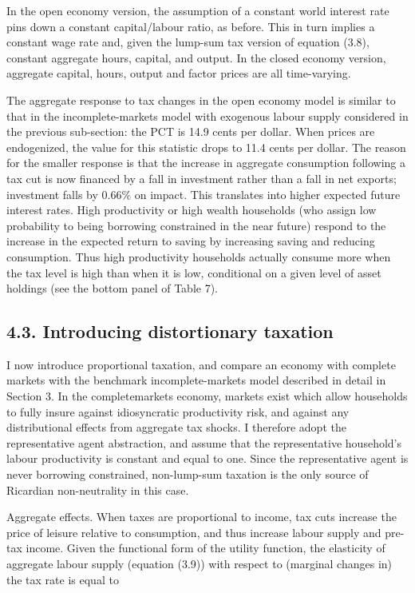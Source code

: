 \documentclass[11pt]{article}
\begin{document}
In the open economy version, the assumption of a constant world interest rate pins down a constant capital/labour ratio, as before. This in turn implies a constant wage rate and, given the lump-sum tax version of equation (3.8), constant aggregate hours, capital, and output. In the closed economy version, aggregate capital, hours, output and factor prices are all time-varying.

The aggregate response to tax changes in the open economy model is similar to that in the incomplete-markets model with exogenous labour supply considered in the previous sub-section: the PCT is 14.9 cents per dollar. When prices are endogenized, the value for this statistic drops to 11.4 cents per dollar. The reason for the smaller response is that the increase in aggregate consumption following a tax cut is now financed by a fall in investment rather than a fall in net exports; investment falls by $0.66 \%$ on impact. This translates into higher expected future interest rates. High productivity or high wealth households (who assign low probability to being borrowing constrained in the near future) respond to the increase in the expected return to saving by increasing saving and reducing consumption. Thus high productivity households actually consume more when the tax level is high than when it is low, conditional on a given level of asset holdings (see the bottom panel of Table 7).

\subsection*{4.3. Introducing distortionary taxation}
I now introduce proportional taxation, and compare an economy with complete markets with the benchmark incomplete-markets model described in detail in Section 3. In the completemarkets economy, markets exist which allow households to fully insure against idiosyncratic productivity risk, and against any distributional effects from aggregate tax shocks. I therefore adopt the representative agent abstraction, and assume that the representative household's labour productivity is constant and equal to one. Since the representative agent is never borrowing constrained, non-lump-sum taxation is the only source of Ricardian non-neutrality in this case.

Aggregate effects. When taxes are proportional to income, tax cuts increase the price of leisure relative to consumption, and thus increase labour supply and pre-tax income. Given the functional form of the utility function, the elasticity of aggregate labour supply (equation (3.9)) with respect to (marginal changes in) the tax rate is equal to
\end{document}
